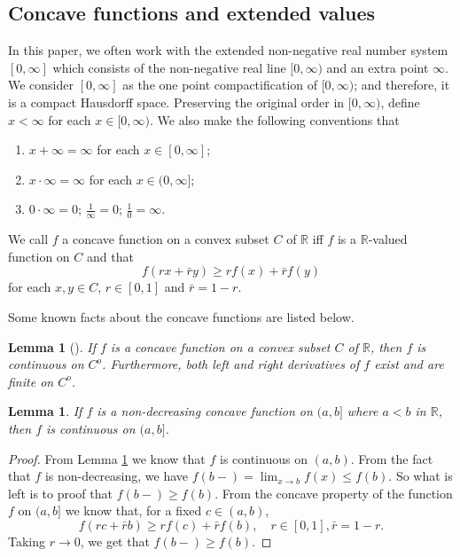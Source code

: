 \documentclass[12pt,a4paper]{amsart}
\numberwithin{equation}{section}
\theoremstyle{plain}
\newtheorem{lem}[thm]{Lemma}
\theoremstyle{definition}
\begin{document}
\subsection{Concave functions and extended values}
In this paper, we often work with the extended non-negative real number system $[0,\infty]$ which consists of the non-negative real line $[0,\infty)$ and an extra point $\infty$. 
We consider $[0,\infty]$ as the one point compactification of $[0,\infty)$; and therefore, it is a compact Hausdorff space.
Preserving the original order in $[0,\infty)$, define $x < \infty$ for each $x\in [0,\infty)$.
We also make the following conventions that 
\begin{enumerate}
\item
$x + \infty = \infty$ for each $x\in [0,\infty]$; 
\item
$x \cdot \infty = \infty$ for each $x\in (0,\infty]$;
\item
$0 \cdot \infty = 0$; $\frac{1}{\infty} = 0$; $\frac{1}{0} = \infty$.
\end{enumerate}

We call $f$ a concave function on a convex subset $C$ of $\mathbb R$ iff $f$ is a $\mathbb R$-valued function on $C$ and that
\[
  f(rx+\bar r y) \geq r f(x) + \bar r f(y)
\]
for each $x,y \in C$, $r \in [0,1]$ and $\bar r = 1 - r$. 

Some known facts about the concave functions are listed below.

\begin{lem}[{\cite[Corollary 6.3.3.]{Dudley2002Real}}]
  \label{lem:ACC}
	If $f$ is a concave function on a convex subset $C$ of $\mathbb R$, then $f$ is continuous on $C^o$.
 Furthermore, both left and right derivatives of $f$ exist and are finite on $C^o$.
\end{lem}

\begin{lem}
  \label{lem:ACR}
	If $f$ is a non-decreasing concave function on $(a,b]$ where $a<b$ in $\mathbb R$, then $f$ is continuous on $(a,b]$.
\end{lem}

\begin{proof}
From Lemma \ref{lem:ACC} we know that $f$ is continuous on $(a,b)$.
From the fact that $f$ is non-decreasing, we have $f(b-) = \lim_{x \to b} f(x) \leq f(b)$. 
So what is left is to proof that $f(b-) \geq f(b)$.
From the concave property of the function $f$ on $(a,b]$ we know that, for a fixed $c \in (a,b)$,
\[
f(rc + \bar r b) 
\geq r f(c) + \bar r f(b),
\quad r\in [0,1], \bar r = 1 - r.
\]
Taking $r\to 0$, we get that $f(b-)\geq f(b)$.
\end{proof}
\end{document}
